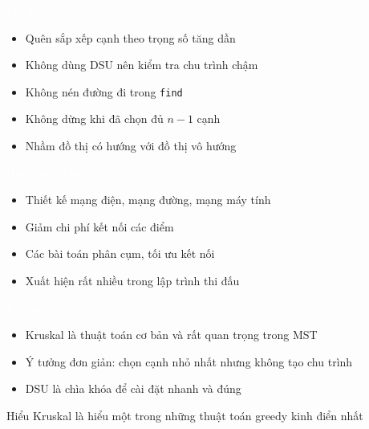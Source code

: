 \documentclass{beamer}
\newcommand{\hlblue}[1]{\textcolor{myblue}{#1}}
\newcommand{\hlpurple}[1]{\textcolor{mypurple}{#1}}
\newcommand{\hlwhite}[1]{\textcolor{white}{#1}}
\begin{document}

\begin{frame}{\hlwhite{Lỗi thường gặp}}
\begin{itemize}
\item Quên sắp xếp cạnh theo trọng số tăng dần
\item Không dùng DSU nên kiểm tra chu trình chậm
\item Không nén đường đi trong \texttt{find}
\item Không dừng khi đã chọn đủ $n-1$ cạnh
\item Nhầm đồ thị có hướng với đồ thị vô hướng
\end{itemize}
\end{frame}


\begin{frame}{\hlwhite{Ứng dụng thực tế}}
\begin{itemize}
\item Thiết kế mạng điện, mạng đường, mạng máy tính
\item Giảm chi phí kết nối các điểm
\item Các bài toán phân cụm, tối ưu kết nối
\item Xuất hiện rất nhiều trong lập trình thi đấu
\end{itemize}
\end{frame}


\begin{frame}{\hlwhite{Kết luận}}
\begin{itemize}
\item Kruskal là thuật toán cơ bản và rất quan trọng trong MST
\item Ý tưởng đơn giản: \hlblue{chọn cạnh nhỏ nhất nhưng không tạo chu trình}
\item DSU là chìa khóa để cài đặt nhanh và đúng
\end{itemize}

\begin{tcolorbox}
\centering
\hlpurple{Hiểu Kruskal là hiểu một trong những thuật toán greedy kinh điển nhất}
\end{tcolorbox}
\end{frame}
\end{document}
